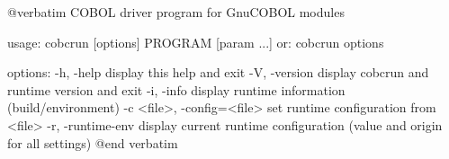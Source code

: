 @verbatim
COBOL driver program for GnuCOBOL modules

usage: cobcrun [options] PROGRAM [param ...]
  or: cobcrun options

options:
  -h, -help             display this help and exit
  -V, -version          display cobcrun and runtime version and exit
  -i, -info             display runtime information (build/environment)
  -c <file>, -config=<file>   set runtime configuration from <file>
  -r, -runtime-env      display current runtime configuration
                        (value and origin for all settings)
@end verbatim

